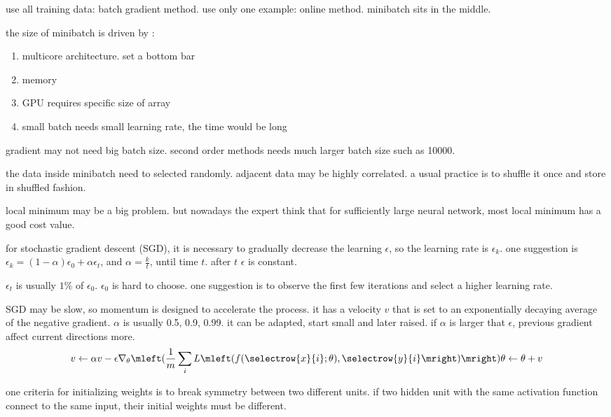 use all training data: batch gradient method. use only one example: online method. minibatch sits in the middle.

the size of minibatch is driven by :
\begin{enumerate}
    \item multicore architecture. set a bottom bar
    \item memory
    \item GPU requires specific size of array
    \item small batch needs small learning rate, the time would be long
\end{enumerate}


gradient may not need big batch size. second order methods needs much larger batch size such as 10000.

the data inside minibatch need to selected randomly. adjacent data may be highly correlated. a usual practice is to shuffle it once and store in shuffled fashion.

local minimum may be a big problem. but nowadays the expert think that for sufficiently large neural network, most local minimum has a good cost value.

for stochastic gradient descent (SGD), it is necessary to gradually decrease the learning $\epsilon$, so the learning rate is $\epsilon_k$. one suggestion is $\epsilon_k = (1-\alpha)\epsilon_0 + \alpha \epsilon_t$, and $\alpha = \frac{k}{t}$, until time $t$. after $t$ $\epsilon$ is constant. 

$\epsilon_t$ is usually $1\%$ of $\epsilon_0$. $\epsilon_0$ is hard to choose. one suggestion is to observe the first few iterations and select a higher learning rate. 

SGD may be slow, so momentum is designed to accelerate the process. it has a velocity $v$ that is set to an exponentially decaying average of the negative gradient. $\alpha$ is usually 0.5, 0.9, 0.99. it can be adapted, start small and later raised. if $\alpha$ is larger that $\epsilon$, previous gradient affect current directions more.
\begin{equation}
    v \leftarrow \alpha v - \epsilon \nabla_\theta \mleft(\frac{1}{m} \sum_i L\mleft(f(\selectrow{x}{i} ;\theta), \selectrow{y}{i}\mright) \mright) \\
    \theta \leftarrow \theta + v
\end{equation}

one criteria for initializing weights is to break symmetry between two different units. if two hidden unit with the same activation function connect to the same input, their initial weights must be different.

